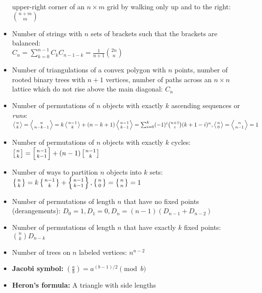 \documentclass[9pt,a4paper,twocolumn,landscape,oneside]{amsart}
\begin{document}
\begin{itemize}[leftmargin=*]
                upper-right corner of an $n\times m$ grid by walking only up
                and to the right: $\binom{n+m}{m}$
            \fi
            \item Number of strings with $n$ sets of brackets such that the
                brackets are balanced: \\ $C_n = \sum_{k=0}^{n-1} C_kC_{n-1-k}
                = \frac{1}{n+1}\binom{2n}n$
            \item Number of triangulations of a convex polygon with $n$ points,
                number of rooted binary trees with $n+1$ vertices, number of
                paths across an $n\times n$ lattice which do not rise above the
                main diagonal: $C_n$
            \item Number of permutations of $n$ objects with exactly $k$
                ascending sequences or {\it runs}: \\ $\left\langle {n \atop k}
                \right\rangle = \left\langle {n \atop n - k - 1} \right\rangle
                = k\left\langle {n - 1 \atop k} \right\rangle + (n - k +
                1)\left\langle {n-1 \atop k-1} \right\rangle =
                \sum_{i=0}^{k}(-1)^i \binom{n+1}{i} (k+1-i)^n, \left\langle {n
                \atop 0} \right\rangle = \left\langle {n \atop n -1}
                \right\rangle = 1$
            \item Number of permutations of $n$ objects with exactly $k$
                cycles: $\left[n \atop k\right] = \left[n-1 \atop k-1\right] +
                (n-1)\left[n-1 \atop k\right]$
            \item Number of ways to partition $n$ objects into $k$ sets:
                $\left\{n \atop k\right\} = k\left\{n-1 \atop k\right\} +
                \left\{n-1 \atop k-1\right\}, \left\{n\atop 0\right\} =
                \left\{n\atop n\right\} = 1$
            \item Number of permutations of length $n$ that have no fixed
                points (derangements): $D_0 = 1, D_1 = 0, D_n = (n - 1)(D_{n-1}
                + D_{n-2})$
            \item Number of permutations of length $n$ that have exactly $k$
                fixed points: $\binom{n}{k} D_{n-k}$
            \item Number of trees on $n$ labeled vertices: $n^{n-2}$
            \item \textbf{Jacobi symbol:} $\left(\frac{a}{b}\right) = a^{(b-1)/2} \pmod{b}$
            \item \textbf{Heron's formula:} A triangle with side lengths

\end{itemize}
\end{document}
